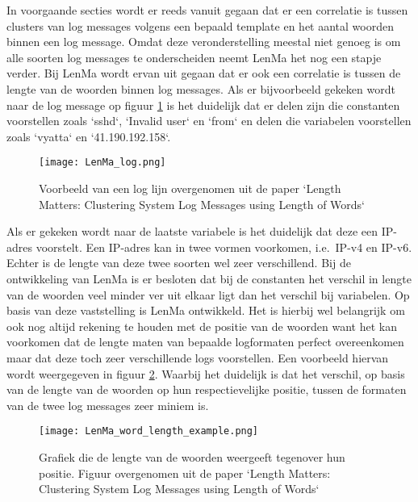 In voorgaande secties wordt er reeds vanuit gegaan dat er een correlatie is tussen clusters van log messages volgens een bepaald template en het aantal woorden binnen een log message. Omdat deze veronderstelling meestal niet genoeg is om alle soorten log messages te onderscheiden neemt LenMa het nog een stapje verder. Bij LenMa wordt ervan uit gegaan dat er ook een correlatie is tussen de lengte van de woorden binnen log messages. Als er bijvoorbeeld gekeken wordt naar de log message op figuur \ref{pic:LenMavoorbeeld} is het duidelijk dat er delen zijn die constanten voorstellen zoals `sshd`, `Invalid user` en `from` en delen die variabelen voorstellen zoals `vyatta` en `41.190.192.158`.\\

\begin{figure}[!htp]
    \texttt{[image: LenMa\_log.png]}
    \caption{Voorbeeld van een log lijn overgenomen uit de paper `Length Matters: Clustering System Log Messages using Length of Words` \autocite{shima2016length}}
    \label{pic:LenMavoorbeeld}
\end{figure}

Als er gekeken wordt naar de laatste variabele is het duidelijk dat deze een IP-adres voorstelt. Een IP-adres kan in twee vormen voorkomen, i.e.\ IP-v4 en IP-v6. Echter is de lengte van deze twee soorten wel zeer verschillend. Bij de ontwikkeling van LenMa is er besloten dat bij de constanten het verschil in lengte van de woorden veel minder ver uit elkaar ligt dan het verschil bij variabelen. Op basis van deze vaststelling is LenMa  ontwikkeld. Het is hierbij wel belangrijk om ook nog altijd rekening te houden met de positie van de woorden want het kan voorkomen dat de lengte maten van bepaalde logformaten perfect overeenkomen maar dat deze toch zeer verschillende logs voorstellen. Een voorbeeld hiervan wordt weergegeven in figuur \ref{pic:LenMagrafiek}. Waarbij het duidelijk is dat het verschil, op basis van de lengte van de woorden op hun respectievelijke positie, tussen de formaten van de twee log messages zeer miniem is.\\

\begin{figure}[!htp]
    \texttt{[image: LenMa\_word\_length\_example.png]}
    \caption{Grafiek die de lengte van de woorden weergeeft tegenover hun positie. Figuur overgenomen uit de paper `Length Matters: Clustering System Log Messages using Length of Words` \autocite{shima2016length}}
    \label{pic:LenMagrafiek}
\end{figure}

